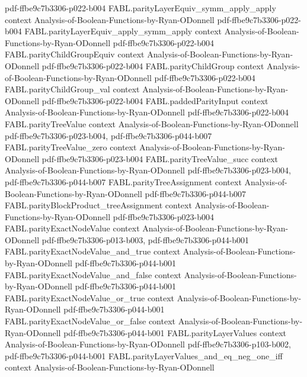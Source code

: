 \begin{theorem}
  {pdf-ffbe9c7b3306-p022-b004}
\proofstep
  {FABL.parityLayerEquiv_symm_apply_apply}
  {context}
  {Analysis-of-Boolean-Functions-by-Ryan-ODonnell}
  {pdf-ffbe9c7b3306-p022-b004}
\proofstep
  {FABL.parityLayerEquiv_apply_symm_apply}
  {context}
  {Analysis-of-Boolean-Functions-by-Ryan-ODonnell}
  {pdf-ffbe9c7b3306-p022-b004}
\proofstep
  {FABL.parityChildGroupEquiv}
  {context}
  {Analysis-of-Boolean-Functions-by-Ryan-ODonnell}
  {pdf-ffbe9c7b3306-p022-b004}
\proofstep
  {FABL.parityChildGroup}
  {context}
  {Analysis-of-Boolean-Functions-by-Ryan-ODonnell}
  {pdf-ffbe9c7b3306-p022-b004}
\proofstep
  {FABL.parityChildGroup_val}
  {context}
  {Analysis-of-Boolean-Functions-by-Ryan-ODonnell}
  {pdf-ffbe9c7b3306-p022-b004}
\proofstep
  {FABL.paddedParityInput}
  {context}
  {Analysis-of-Boolean-Functions-by-Ryan-ODonnell}
  {pdf-ffbe9c7b3306-p022-b004}
\proofstep
  {FABL.parityTreeValue}
  {context}
  {Analysis-of-Boolean-Functions-by-Ryan-ODonnell}
  {pdf-ffbe9c7b3306-p023-b004,
    pdf-ffbe9c7b3306-p044-b007}
\proofstep
  {FABL.parityTreeValue_zero}
  {context}
  {Analysis-of-Boolean-Functions-by-Ryan-ODonnell}
  {pdf-ffbe9c7b3306-p023-b004}
\proofstep
  {FABL.parityTreeValue_succ}
  {context}
  {Analysis-of-Boolean-Functions-by-Ryan-ODonnell}
  {pdf-ffbe9c7b3306-p023-b004,
    pdf-ffbe9c7b3306-p044-b007}
\proofstep
  {FABL.parityTreeAssignment}
  {context}
  {Analysis-of-Boolean-Functions-by-Ryan-ODonnell}
  {pdf-ffbe9c7b3306-p044-b007}
\proofstep
  {FABL.parityBlockProduct_treeAssignment}
  {context}
  {Analysis-of-Boolean-Functions-by-Ryan-ODonnell}
  {pdf-ffbe9c7b3306-p023-b004}
\proofstep
  {FABL.parityExactNodeValue}
  {context}
  {Analysis-of-Boolean-Functions-by-Ryan-ODonnell}
  {pdf-ffbe9c7b3306-p013-b003,
    pdf-ffbe9c7b3306-p044-b001}
\proofstep
  {FABL.parityExactNodeValue_and_true}
  {context}
  {Analysis-of-Boolean-Functions-by-Ryan-ODonnell}
  {pdf-ffbe9c7b3306-p044-b001}
\proofstep
  {FABL.parityExactNodeValue_and_false}
  {context}
  {Analysis-of-Boolean-Functions-by-Ryan-ODonnell}
  {pdf-ffbe9c7b3306-p044-b001}
\proofstep
  {FABL.parityExactNodeValue_or_true}
  {context}
  {Analysis-of-Boolean-Functions-by-Ryan-ODonnell}
  {pdf-ffbe9c7b3306-p044-b001}
\proofstep
  {FABL.parityExactNodeValue_or_false}
  {context}
  {Analysis-of-Boolean-Functions-by-Ryan-ODonnell}
  {pdf-ffbe9c7b3306-p044-b001}
\proofstep
  {FABL.parityLayerValues}
  {context}
  {Analysis-of-Boolean-Functions-by-Ryan-ODonnell}
  {pdf-ffbe9c7b3306-p103-b002,
    pdf-ffbe9c7b3306-p044-b001}
\proofstep
  {FABL.parityLayerValues_and_eq_neg_one_iff}
  {context}
  {Analysis-of-Boolean-Functions-by-Ryan-ODonnell}

\end{theorem}
